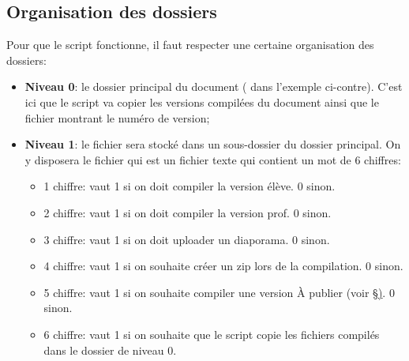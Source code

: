 \documentclass[11pt]{article}
\begin{document}
\subsection{Organisation des dossiers}
\begin{figure}
  \centering
  \vspace{-1em}
  \vspace{-1em}
\end{figure}
\noindent Pour que le script fonctionne, il faut respecter une certaine organisation des dossiers:
\begin{itemize}
\item \textbf{Niveau 0}: le dossier principal du document ( dans l'exemple ci-contre). C'est ici que le script va copier les versions compilées du document ainsi que le fichier montrant le numéro de version;
\item \textbf{Niveau 1}: le fichier  sera stocké dans un sous-dossier  du dossier principal. On y disposera le fichier  qui est un fichier texte qui contient un mot de 6 chiffres:
\begin{itemize}
\item 1\ier{} chiffre: vaut 1 si on doit compiler la version élève. 0 sinon.
\item 2\ieme{} chiffre: vaut 1 si on doit compiler la version prof. 0 sinon.
\item 3\ieme{} chiffre: vaut 1 si on doit uploader un diaporama. 0 sinon.
\item 4\ieme{} chiffre: vaut 1 si on souhaite créer un zip lors de la compilation. 0 sinon.
\item 5\ieme{} chiffre: vaut 1 si on souhaite compiler une version \og À publier\fg{} (voir \S \href{aPublier}). 0 sinon.
\item 6\ieme{} chiffre: vaut 1 si on souhaite que le script copie les fichiers compilés dans le dossier de niveau 0.
\end{itemize}
\end{itemize}
\end{document}
